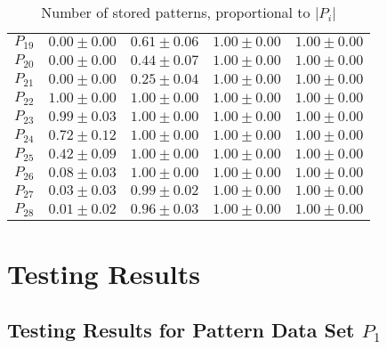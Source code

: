 \documentclass[anon]{CI}
\begin{document}
\begin{table}[H]
\begin{tabular}{ccccc}
				$P_{19}$  & $0.00\pm0.00$  & $0.61\pm0.06$  & $1.00\pm0.00$  & $1.00\pm0.00$ \\
				$P_{20}$  & $0.00\pm0.00$  & $0.44\pm0.07$  & $1.00\pm0.00$  & $1.00\pm0.00$ \\
				$P_{21}$  & $0.00\pm0.00$  & $0.25\pm0.04$  & $1.00\pm0.00$  & $1.00\pm0.00$ \\
				$P_{22}$  & $1.00\pm0.00$  & $1.00\pm0.00$  & $1.00\pm0.00$  & $1.00\pm0.00$ \\
				$P_{23}$  & $0.99\pm0.03$  & $1.00\pm0.00$  & $1.00\pm0.00$  & $1.00\pm0.00$ \\
				$P_{24}$  & $0.72\pm0.12$  & $1.00\pm0.00$  & $1.00\pm0.00$  & $1.00\pm0.00$ \\
				$P_{25}$  & $0.42\pm0.09$  & $1.00\pm0.00$  & $1.00\pm0.00$  & $1.00\pm0.00$ \\
				$P_{26}$  & $0.08\pm0.03$  & $1.00\pm0.00$  & $1.00\pm0.00$  & $1.00\pm0.00$ \\
				$P_{27}$  & $0.03\pm0.03$  & $0.99\pm0.02$  & $1.00\pm0.00$  & $1.00\pm0.00$ \\
				$P_{28}$  & $0.01\pm0.02$  & $0.96\pm0.03$  & $1.00\pm0.00$  & $1.00\pm0.00$ \\
				
			\end{tabular}
			\caption{Number of stored patterns, proportional to $\left|P_i\right|$}
		\end{table}
		
		\section{Testing Results}\label{AppE}
		\subsection{Testing Results for Pattern Data Set $P_{1}$}
		
		
\end{document}
